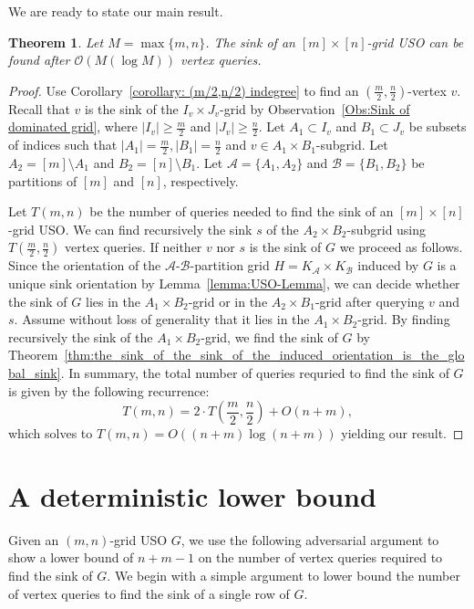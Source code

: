 \documentclass[a4paper,10pt]{article}
\newtheorem{theorem}{Theorem}
\newcommand{\A}{\ensuremath{\mathcal A}}
\newcommand{\B}{\ensuremath{\mathcal B}}
\begin{document}
We are ready to state our main result. 
\begin{theorem}\label{theorem:Sink algorithm}
 Let $M = \max\{m,n\}$. The sink of an $[m]\times[n]$-grid USO can be found after $\mathcal{O}(M(\log M))$ vertex queries.
\end{theorem}
\begin{proof}
Use Corollary~\ref{corollary: (m/2,n/2) indegree} to find an $(\frac{m}{2}, \frac{n}{2})$-vertex $v$. 
Recall that $v$ is the sink of the $I_v\times J_v$-grid by Observation~\ref{Obs:Sink of dominated grid}, where $|I_v| \geq \frac{m}{2}$ and $|J_v|\geq \frac{n}{2}$. Let $A_1\subset I_v$ and $B_1\subset J_v$ be subsets of indices such that $|A_1| = \frac{m}{2}, |B_1| = \frac{n}{2}$ and $v\in A_1\times B_1$-subgrid.
Let $A_2= [m]\setminus A_1$ and $B_2 = [n]\setminus B_1$.
Let $\A = \{A_1, A_2\}$ and $\B = \{B_1, B_2\}$ be partitions of $[m]$ and $[n]$, respectively.

Let $T(m, n)$ be the number of queries needed to find the sink of an $[m]\times[n]$-grid USO.
We can find recursively the sink $s$ of the $A_2\times B_2$-subgrid using $T(\frac{m}{2}, \frac{n}{2})$ vertex queries. 
If neither $v$ nor $s$ is the sink of $G$ we proceed as follows.
Since the orientation of the $\A$-$\B$-partition grid $H = K_\A \times K_\B$ induced by $G$ is a unique sink orientation by Lemma~\ref{lemma:USO-Lemma}, we can decide whether the sink of $G$ lies in the $A_1\times B_2$-grid or in the $A_2\times B_1$-grid after querying $v$ and $s$. Assume without loss of generality that it lies in the $A_1\times B_2$-grid.
By finding recursively the sink of the $A_1\times B_2$-grid, we find the sink of $G$ by Theorem~\ref{thm:the_sink_of_the_sink_of_the_induced_orientation_is_the_global_sink}. In summary, the total number of queries requried to find the sink of $G$ is given by the following recurrence:
$$T(m, n) = 2\cdot T\left(\frac{m}{2}, \frac{n}{2}\right) + O(n+m),$$
which solves to $T(m, n) = O((n+m) \log (n+m))$ yielding our result.
\end{proof}
 
\section{A deterministic lower bound}
\label{section:a_deterministic_lower_bound}

Given an $(m, n)$-grid USO $G$, we use the following adversarial argument to show a lower bound of $n + m -1$ on the number of vertex queries required to find the sink of $G$.
We begin with a simple argument to lower bound the number of vertex queries to find the sink of a single row of $G$.
\end{document}
